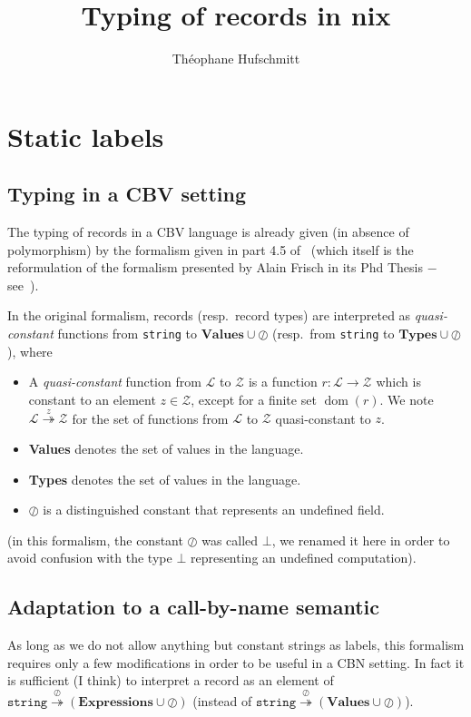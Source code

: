 \documentclass{article}
\title{Typing of records in nix}
\author{Théophane Hufschmitt}
\date{}
\newcommand{\ty}[1]{\texttt{#1}}
\newcommand{\set}[1]{\ensuremath{\mathcal{#1}}}
\newcommand{\undef}{\oslash}
\newcommand{\quasiconst}[1]{\overset{#1}{\twoheadrightarrow}}
\DeclareMathOperator\dom{dom}
\newcommand{\Γ}{\Gamma}
\newcommand{\τ}{\tau}
\newcommand{\σ}{\sigma}
\begin{document}
\maketitle{}

\section{Static labels}
\subsection{Typing in a CBV setting}
The typing of records in a CBV language is already given (in absence of
polymorphism) by the formalism given in part 4.5 of~\cite{Cas15} (which itself
is the reformulation of the formalism presented by Alain Frisch in its Phd
Thesis − see~\cite{Fri04}).

In the original formalism, records (resp.\ record types) are interpreted as
\emph{quasi-constant} functions from \ty{string} to $\textbf{Values} \cup
\undef$ (resp.\ from \ty{string} to $\textbf{Types} \cup \undef$), where
\begin{itemize}
  \item A \emph{quasi-constant} function from \set{L} to \set{Z} is a
    function $r: \set{L} \rightarrow \set{Z}$ which is constant to an element
    $z \in \set{Z}$, except for a finite set $\dom(r)$. We note $\set{L}
    \quasiconst{z} \set{Z}$ for the set of functions from \set{L} to \set{Z}
    quasi-constant to $z$.
  \item \textbf{Values} denotes the set of values in the language.
  \item \textbf{Types} denotes the set of values in the language.
  \item $\undef$ is a distinguished constant that represents an undefined
    field.
\end{itemize}

(in this formalism, the constant $\undef$ was called $\bot$, we renamed it here
in order to avoid confusion with the type $\bot$ representing an undefined
computation).

\subsection{Adaptation to a call-by-name semantic}

As long as we do not allow anything but constant strings as labels, this
formalism requires only a few modifications in order to be useful in a CBN
setting. In fact it is sufficient (I think) to interpret a record as an element
of $\ty{string} \quasiconst{\undef} \left(\textbf{Expressions} \cup
\undef\right)$ (instead of $\ty{string} \quasiconst{\undef}
\left(\textbf{Values} \cup \undef\right)$).
\end{document}
